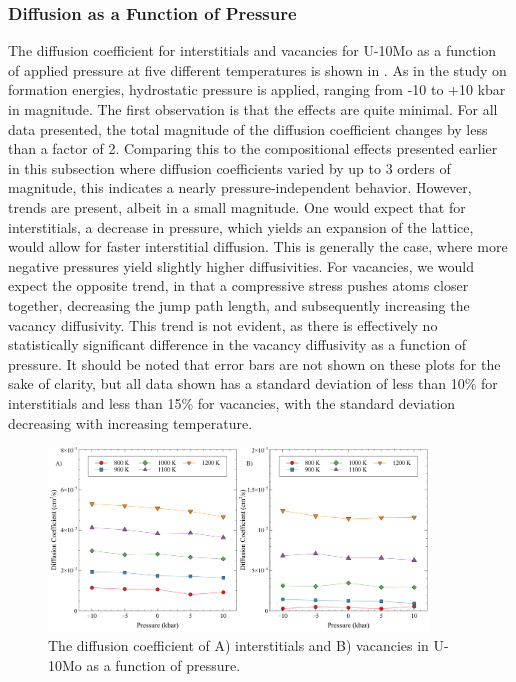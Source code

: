 \documentclass[review]{elsarticle}
\begin{document}
\FloatBarrier

\subsubsection{Diffusion as a Function of Pressure}

The diffusion coefficient for interstitials and vacancies for U-10Mo as a function of applied pressure at five different temperatures is shown in . As in the study on formation energies, hydrostatic pressure is applied, ranging from -10 to +10 kbar in magnitude. The first observation is that the effects are quite minimal. For all data presented, the total magnitude of the diffusion coefficient changes by less than a factor of 2. Comparing this to the compositional effects presented earlier in this subsection where diffusion coefficients varied by up to 3 orders of magnitude, this indicates a nearly pressure-independent behavior. However, trends are present, albeit in a small magnitude. One would expect that for interstitials, a decrease in pressure, which yields an expansion of the lattice, would allow for faster interstitial diffusion. This is generally the case, where more negative pressures yield slightly higher diffusivities. For vacancies, we would expect the opposite trend, in that a compressive stress pushes atoms closer together, decreasing the jump path length, and subsequently increasing the vacancy diffusivity. This trend is not evident, as there is effectively no statistically significant difference in the vacancy diffusivity as a function of pressure. It should be noted that error bars are not shown on these plots for the sake of clarity, but all data shown has a standard deviation of less than 10\% for interstitials and less than 15\% for vacancies, with the standard deviation decreasing with increasing temperature. 

\begin{figure}[h!]
    \centering
    \includegraphics[width=0.9\textwidth]{int_vac_p.pdf}
    \caption{The diffusion coefficient of A) interstitials and B) vacancies in U-10Mo as a function of pressure.}
    \label{fig:int_vac_p}
\end{figure}
\end{document}

